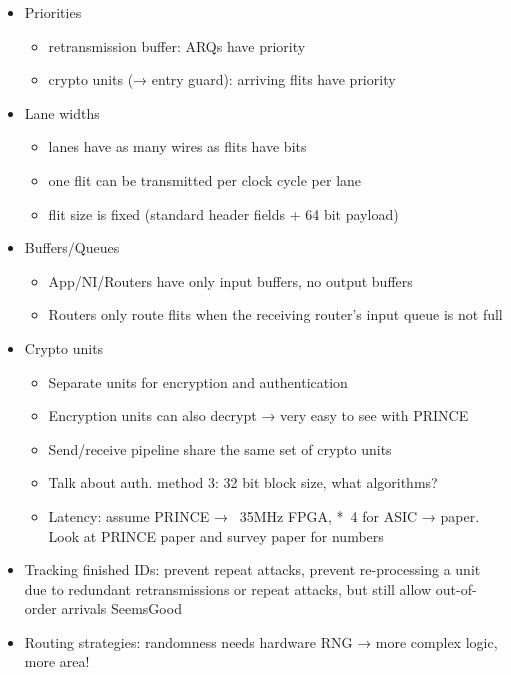 \begin{itemize}
\begin{itemize}
        \end{itemize}
    \item Priorities
        \begin{itemize}
            \item retransmission buffer: ARQs have priority
            \item crypto units (→ entry guard): arriving flits have priority
        \end{itemize}
    \item Lane widths
        \begin{itemize}
            \item lanes have as many wires as flits have bits
            \item one flit can be transmitted per clock cycle per lane
            \item flit size is fixed (standard header fields + 64 bit payload)
        \end{itemize}
    \item Buffers/Queues
        \begin{itemize}
            \item App/NI/Routers have only input buffers, no output buffers
            \item Routers only route flits when the receiving router's input queue is not full
        \end{itemize}
    \item Crypto units
        \begin{itemize}
            \item Separate units for encryption and authentication
            \item Encryption units can also decrypt → very easy to see with PRINCE
            \item Send/receive pipeline share the same set of crypto units
            \item Talk about auth. method 3: 32 bit block size, what algorithms?
            \item Latency: assume PRINCE → ~35MHz FPGA, *~4 for ASIC → paper. Look at PRINCE paper and survey paper for numbers
        \end{itemize}
    \item Tracking finished IDs: prevent repeat attacks, prevent re-processing a unit due to redundant retransmissions or repeat attacks, but still
        allow out-of-order arrivals SeemsGood
    \item Routing strategies: randomness needs hardware RNG → more complex logic, more area!
\end{itemize}

